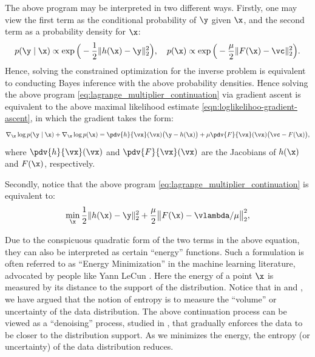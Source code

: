 \documentclass[../../book-main.tex]{subfiles}
\begin{document}
The above program may be interpreted in two different ways. Firstly, one may view the first term as the conditional probability of $\y$ given $\x$, and the second term as a probability density for $\x$:
\begin{equation}
  p(\y\mid \x) \propto \exp\Big(- \frac{1}{2}\|h(\x) - \y\|_2^2\Big), \quad 
    p(\x) \propto \exp\Big( - \frac{\mu}{2}\|F(\x) - \vc\|_2^2\Big).
\end{equation} 
Hence, solving the constrained optimization for the inverse problem is equivalent to conducting Bayes inference with the above probability densities. Hence solving the above program \eqref{eq:lagrange_multiplier_continuation} via gradient ascent is equivalent to the above maximal likelihood estimate \eqref{eqn:loglikelihoo-gradient-ascent}, 
in which the gradient  takes the form:
\begin{equation}
   \nabla_{\x} \log p(\y \mid \x) + \nabla_{\x} \log p(\x)   =  \pdv{h}{\vx}(\vx)\big(\y - h(\x)\big) + \mu \pdv{F}{\vx}(\vx)\big(\vc - F(\x)\big),
\end{equation}
where $\pdv{h}{\vx}(\vx)$ and $\pdv{F}{\vx}(\vx)$ are the Jacobians of $h(\x)$ and $F(\x)$, respectively.

Secondly, notice that the above program \eqref{eq:lagrange_multiplier_continuation} is equivalent to:
\begin{equation}
\min_{\x} \frac{1}{2}\|h(\x) - \y\|_2^2 + \frac{\mu}{2} \big\|F(\x) - \vlambda/\mu\big\|_2^2,
\label{eqn:energy-minimization}
\end{equation} 

\begin{remark}
Due to the conspicuous quadratic form of the two terms in the above equation, they can also be interpreted as certain ``energy'' functions. Such a formulation is often referred to as ``Energy Minimization'' in the machine learning literature, advocated by people like Yann LeCun \cite{LeCun-2006}. Here the energy of a point $\x$ is measured by its distance to the support of the distribution. Notice that in  and , we have argued that the notion of entropy is to measure the ``volume'' or uncertainty of the data distribution. The above continuation process can be viewed as a ``denoising'' process, studied in  , that gradually enforces the data to be closer to the distribution support. As we minimizes the energy, the entropy (or uncertainty) of the data distribution reduces. 
\end{remark}
\end{document}
